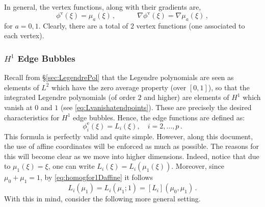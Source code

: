 In general, the vertex functions, along with their gradients are,
\begin{equation}
    \phi^\mathrm{v}(\xi) = \mu_a(\xi)\,,\qquad \quad \nabla\phi^\mathrm{v}(\xi)=\nabla\mu_a(\xi)\,,
\end{equation}
for $a=0,1$. Clearly, there are a total of $2$ vertex functions (one associated to each vertex).


\subsubsection{\texorpdfstring{$H^1$}{H1} Edge Bubbles}
Recall from \S\ref{sec:LegendrePol} that the Legendre polynomials are seen as elements of $L^2$ which have the zero average property (over $[0,1]$), so that the integrated Legendre polynomials (of order $2$ and higher) are elements of $H^1$ which vanish at $0$ and $1$ (see \eqref{eq:Lvanishatendpoints}).
These are precisely the desired characteristics for $H^1$ edge bubbles.
Hence, the edge functions are defined as:
\begin{equation*}
    \phi^\mathrm{e}_i(\xi) = L_{i}(\xi),\quad i=2,\ldots,p\,.
\end{equation*}
This formula is perfectly valid and quite simple.
However, along this document, the use of affine coordinates will be enforced as much as possible.
The reasons for this will become clear as we move into higher dimensions.
Indeed, notice that due to $\mu_1(\xi)=\xi$, one can write $L_i(\xi)=L_i(\mu_1(\xi))$.
Moreover, since $\mu_0+\mu_1=1$, by \eqref{eq:homogfor1Daffine} it follows
\begin{equation*}
	L_i(\mu_1)=L_i(\mu_1;1)=[L_i](\mu_0,\mu_1)\,.
\end{equation*}
With this in mind, consider the following more general setting.

